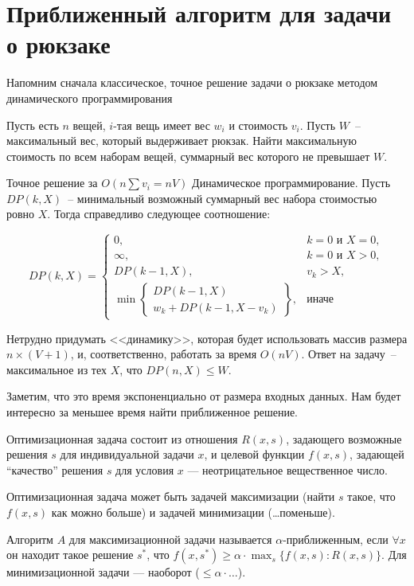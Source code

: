\section{Приближенный алгоритм для задачи о рюкзаке}

\secauthor{\denis}

Напомним сначала классическое, точное решение задачи о рюкзаке методом динамического программирования

\begin{problem*}[0/1-рюкзак]
	Пусть есть $n$ вещей, $i$-тая вещь имеет вес $w_i$ и стоимость $v_i$. Пусть $W$~-- максимальный вес, который выдерживает рюкзак. Найти максимальную стоимость по всем наборам вещей, суммарный вес которого не превышает $W$.
\end{problem*}

\begin{algodescription}{Точное решение за $O\left(n\sum{v_i}=nV\right)$} Динамическое программирование. Пусть $DP(k, X)$~-- минимальный возможный суммарный вес набора стоимостью ровно $X$. Тогда справедливо следующее соотношение:

$$ DP(k, X) = 
\begin{cases}
    0, & k=0\text{ и }X=0, \\
    \infty, & k=0\text{ и }X>0, \\
    DP(k-1, X), & v_k > X, \\
    \min \begin{Bmatrix}
        DP(k-1, X) \\ w_k + DP(k-1, X-v_k)
    \end{Bmatrix}, & \text{иначе}
\end{cases}
$$

Нетрудно придумать <<динамику>>, которая будет использовать массив размера $n \times (V+1)$, и, соответственно, работать за время $O(nV)$. Ответ на задачу~-- максимальное из тех $X$, что $DP(n, X) \leq W$.
\end{algodescription}

Заметим, что это время экспоненциально от размера входных данных.
Нам будет интересно за меньшее время найти приближенное решение.
\begin{definition*}
Оптимизационная задача состоит из отношения $R(x,s)$, задающего возможные решения $s$ для индивидуальной задачи $x$,
и целевой функции $f(x,s)$, задающей ``качество'' решения $s$ для условия $x$ --- неотрицательное вещественное число.

Оптимизационная задача может быть задачей максимизации (найти $s$ такое, что $f(x,s)$ как можно больше)
и задачей минимизации (\ldots поменьше).

Алгоритм $A$ для максимизационной задачи называется $\alpha$-приближенным,
если $\forall x$ он находит такое решение $s^*$, что $f(x,s^*)\ge \alpha\cdot \max_s \{f(x,s)\colon R(x,s)\}$.
Для минимизационной задачи --- наоборот ($\le \alpha \cdot \ldots$).
\end{definition*}

